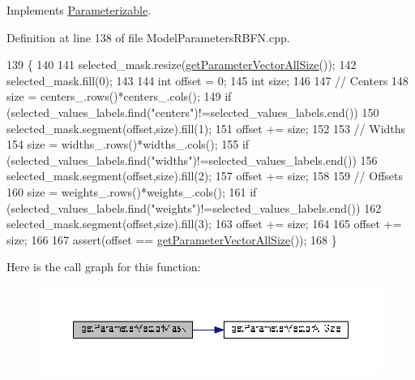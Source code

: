 Implements \hyperlink{classDmpBbo_1_1Parameterizable_ae7f6cbc5723ed4734ded5f2ba59bd366}{Parameterizable}.



Definition at line 138 of file Model\+Parameters\+R\+B\+F\+N.\+cpp.


\begin{DoxyCode}
139 \{
140 
141   selected\_mask.resize(\hyperlink{classDmpBbo_1_1ModelParametersRBFN_ab24d2485b3b795b516f4844f225100eb}{getParameterVectorAllSize}());
142   selected\_mask.fill(0);
143   
144   \textcolor{keywordtype}{int} offset = 0;
145   \textcolor{keywordtype}{int} size;
146   
147   \textcolor{comment}{// Centers}
148   size = centers\_.rows()*centers\_.cols();
149   \textcolor{keywordflow}{if} (selected\_values\_labels.find(\textcolor{stringliteral}{"centers"})!=selected\_values\_labels.end())
150     selected\_mask.segment(offset,size).fill(1);
151   offset += size;
152   
153   \textcolor{comment}{// Widths}
154   size = widths\_.rows()*widths\_.cols();
155   \textcolor{keywordflow}{if} (selected\_values\_labels.find(\textcolor{stringliteral}{"widths"})!=selected\_values\_labels.end())
156     selected\_mask.segment(offset,size).fill(2);
157   offset += size;
158   
159   \textcolor{comment}{// Offsets}
160   size = weights\_.rows()*weights\_.cols();
161   \textcolor{keywordflow}{if} (selected\_values\_labels.find(\textcolor{stringliteral}{"weights"})!=selected\_values\_labels.end())
162     selected\_mask.segment(offset,size).fill(3);
163   offset += size;
164 
165   offset += size;
166 
167   assert(offset == \hyperlink{classDmpBbo_1_1ModelParametersRBFN_ab24d2485b3b795b516f4844f225100eb}{getParameterVectorAllSize}());   
168 \}
\end{DoxyCode}


Here is the call graph for this function\+:
\nopagebreak
\begin{figure}[H]
\begin{center}
\leavevmode
\includegraphics[width=350pt]{classDmpBbo_1_1ModelParametersRBFN_a9dba1f93e426e7511630ec1ece4ace17_cgraph}
\end{center}
\end{figure}


